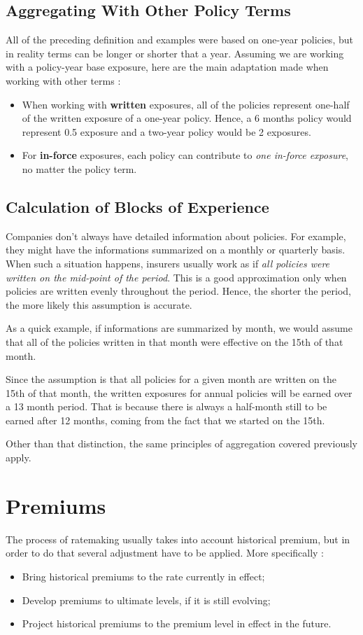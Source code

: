 \documentclass[11pt, english]{memoir}
\numberwithin{definition}{section}
\begin{document}
\section{Aggregating With Other Policy Terms}
	All of the preceding definition and examples were based on one-year policies, but in reality terms can be longer or shorter that a year. Assuming we are working with a policy-year base exposure, here are the main adaptation made when working with other terms : 
	\begin{itemize}
		\item When working with \textbf{written} exposures, all of the policies represent one-half of the written exposure of a one-year policy. Hence, a 6 months policy would represent 0.5 exposure and a two-year policy would be 2 exposures. \\
		\item For \textbf{in-force} exposures, each policy can contribute to \emph{one in-force exposure}, no matter the policy term. 
	\end{itemize}

\section{Calculation of Blocks of Experience}
	Companies don't always have detailed information about policies. For example, they might have the informations summarized on a monthly or quarterly basis. When such a situation happens, insurers usually work as if \emph{all policies were written on the mid-point of the period}. This is a good approximation only when policies are written evenly throughout the period. Hence, the shorter the period, the more likely this assumption is accurate. 

	As a quick example, if informations are summarized by month, we would assume that all of the policies written in that month were effective on the 15th of that month. 

	Since the assumption is that all policies for a given month are written on the 15th of that month, the written exposures for annual policies will be earned over a 13 month period. That is because there is always a half-month still to be earned after 12 months, coming from the fact that we started on the 15th.

	Other than that distinction, the same principles of aggregation covered previously apply.




\chapter{Premiums}
	The process of ratemaking usually takes into account historical premium, but in order to do that several adjustment have to be applied. More specifically : 
	\begin{itemize}
		\item Bring historical premiums to the rate currently in effect;
		\item Develop premiums to ultimate levels, if it is still evolving; 
		\item Project historical premiums to the premium level in effect in the future. 
	\end{itemize}
	
\end{document}
